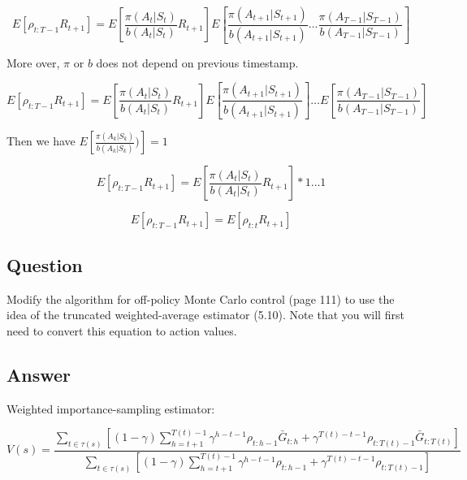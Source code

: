\documentclass[11pt]{article}
\begin{document}
    \begin{equation}
        E[\rho_{t:T-1}R_{t+1}] = E[\frac{\pi(A_t|S_t)}{b(A_t|S_t)} R_{t+1}] E[\frac{\pi(A_{t+1}|S_{t+1})}{b(A_{t+1}|S_{t+1})} \dots \frac{\pi(A_{T-1}|S_{T-1})}{b(A_{T-1}|S_{T-1})}]
    \end{equation}

    More over, $\pi$ or $b$ does not depend on previous timestamp.

    \begin{equation}
        E[\rho_{t:T-1}R_{t+1}] = E[\frac{\pi(A_t|S_t)}{b(A_t|S_t)} R_{t+1}] E[\frac{\pi(A_{t+1}|S_{t+1})}{b(A_{t+1}|S_{t+1})}] \dots E[\frac{\pi(A_{T-1}|S_{T-1})}{b(A_{T-1}|S_{T-1})}]
    \end{equation}

    Then we have $E[\frac{ \pi( A_{k}|S_{k} )}{ b(A_{k}|S_{k})})] = 1$


    \begin{equation}
        E[\rho_{t:T-1}R_{t+1}] = E[\frac{\pi(A_t|S_t)}{b(A_t|S_t)} R_{t+1}] * 1 \dots 1
    \end{equation}

    \begin{equation}
        E[\rho_{t:T-1}R_{t+1}] = E[\rho_{t:t}R_{t+1}]
    \end{equation}


    \subsection{Question}

    Modify the algorithm for off-policy Monte Carlo control (page 111) to use the idea of the truncated weighted-average estimator (5.10).
    Note that you will first need to convert this equation to action values.

    \subsection*{Answer}

    Weighted importance-sampling estimator:

    \begin{equation}
        V(s) =  \frac{ \sum_{t \in \tau(s) } [ (1-\gamma) \sum_{h=t+1}^{T(t)-1} \gamma^{h-t-1} \rho_{t:h-1} \bar{G}_{t:h} + \gamma^{T(t)-t-1} \rho_{t:T(t)-1} \bar{G}_{t:T(t)} ]   }{ \sum_{t \in \tau(s) } [ (1-\gamma) \sum_{h=t+1}^{T(t)-1} \gamma^{h-t-1} \rho_{t:h-1} + \gamma^{T(t)-t-1} \rho_{t:T(t)-1} ]  }
    \end{equation}
\end{document}
